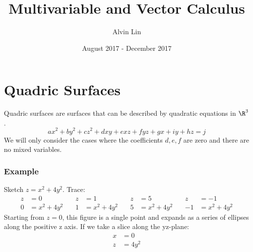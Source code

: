 \documentclass[letterpaper, 12pt]{math}
\title{Multivariable and Vector Calculus}
\author{Alvin Lin}
\date{August 2017 - December 2017}
\begin{document}
\maketitle

\section*{Quadric Surfaces}
Quadric surfaces are surfaces that can be described by quadratic equations in
\( \R^3 \).
\[ ax^2+by^2+cz^2+dxy+exz+fyz+gx+iy+hz = j \]
We will only consider the cases where the coefficients \( d,e,f \) are zero
and there are no mixed variables.

\subsubsection*{Example}
Sketch \( z = x^2+4y^2 \). Trace:
\[\begin{split}
  z &= 0 \\
  0 &= x^2+4y^2
\end{split}
\quad
\begin{split}
  z &= 1 \\
  1 &= x^2+4y^2
\end{split}
\quad
\begin{split}
  z &= 5 \\
  5 &= x^2+4y^2
\end{split}
\quad
\begin{split}
  z &= -1 \\
  -1 &= x^2+4y^2
\end{split} \]
Starting from \( z = 0 \), this figure is a single point and expands as a series
of ellipses along the positive z axis. If we take a slice along the yz-plane:
\begin{align*}
  x &= 0 \\
  z &= 4y^2
\end{align*}
\begin{center}
\end{center}
\end{document}
